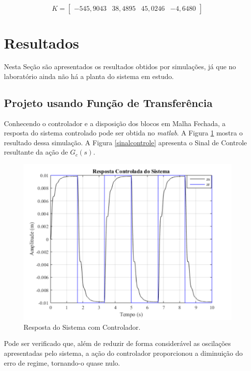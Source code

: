 \documentclass[journal,brazil,english]{IEEEtran}
\begin{document}
\begin{equation}\label{matrizk}
K = \left[ \begin{matrix}
-545,9043 & 38,4895 & 45,0246 & -4,6480
\end{matrix} \right]
\end{equation}

\section{Resultados}\label{resultados}
Nesta Seção são apresentados os resultados obtidos por simulações, já que no laboratório ainda não há a planta do sistema em estudo.

\subsection{Projeto usando Função de Transferência}
Conhecendo o controlador e a disposição dos blocos em Malha Fechada, a resposta do sistema controlado pode ser obtida no \textit{matlab}. A Figura \ref{mfechadacontrolada} mostra o resultado dessa simulação. A Figura \ref{sinalcontrole} apresenta o Sinal de Controle resultante da ação de $G_c(s)$.

\begin{figure}[H]
	\centering
\includegraphics[width=\columnwidth]{./imagens/resposta_controlada.pdf}
    \renewcommand{\figurename}{Fig.}
    \caption{Resposta do Sistema com Controlador.}
	\label{mfechadacontrolada}
\end{figure}

Pode ser verificado que, além de reduzir de forma considerável as oscilações apresentadas pelo sistema, a ação do controlador proporcionou a diminuição do erro de regime, tornando-o quase nulo.
\end{document}
